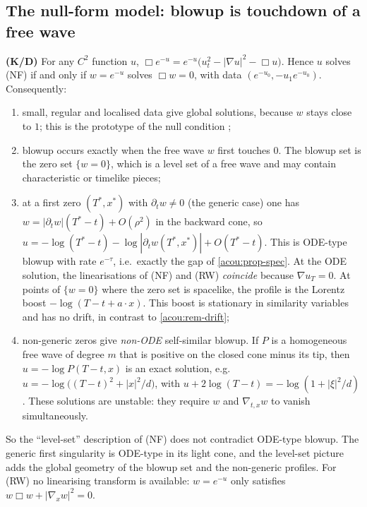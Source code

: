 \subsection{The null-form model: blowup is touchdown of a free wave}
\label{acou:sub-nf}
\textbf{(K/D)} For any $C^2$ function $u$,
$\Box e^{-u}=e^{-u}\big(u_t^2-|\nabla u|^2-\Box u\big)$. Hence $u$ solves (NF)
if and only if $w=e^{-u}$ solves $\Box w=0$, with data
$(e^{-u_0},-u_1e^{-u_0})$. Consequently:
\begin{enumerate}[nosep,label=(\alph*)]
\item small, regular and localised data give global solutions, because $w$
  stays close to $1$; this is the prototype of the null condition
  \cite{Klainerman1986}; %
\item blowup occurs exactly when the free wave $w$ first touches $0$. The
  blowup set is the zero set $\{w=0\}$, which is a level set of a free wave
  and may contain characteristic or timelike pieces;
\item at a first zero $(T^\ast,x^\ast)$ with $\partial_tw\ne0$ (the generic
  case) one has $w=|\partial_tw|(T^\ast-t)+O(\rho^2)$ in the backward cone,
  so $u=-\log(T^\ast-t)-\log|\partial_tw(T^\ast,x^\ast)|+O(T^\ast-t)$. This is
  ODE-type blowup with rate $e^{-\tau}$, i.e.\ exactly the gap of
  \cref{acou:prop-spec}. At the ODE solution, the linearisations of (NF) and
  (RW) \emph{coincide} because $\nabla u_T=0$. At points of $\{w=0\}$ where
  the zero set is spacelike, the profile is the Lorentz boost
  $-\log(T-t+a\cdot x)$. This boost is stationary in similarity variables and
  has no drift, in contrast to \cref{acou:rem-drift};
\item non-generic zeros give \emph{non-ODE} self-similar blowup. If $P$ is a
  homogeneous free wave of degree $m$ that is positive on the closed cone
  minus its tip, then $u=-\log P(T-t,x)$ is an exact solution, e.g.\
  $u=-\log\big((T-t)^2+|x|^2/d\big)$, with $u+2\log(T-t)=-\log(1+|\xi|^2/d)$.
  These solutions are unstable: they require $w$ and $\nabla_{t,x}w$ to
  vanish simultaneously.
\end{enumerate}
So the ``level-set'' description of (NF) does not contradict ODE-type blowup.
The generic first singularity is ODE-type in its light cone, and the
level-set picture adds the global geometry of the blowup set and the
non-generic profiles. For (RW) no linearising transform is available:
$w=e^{-u}$ only satisfies $w\Box w+|\nabla_xw|^2=0$.

